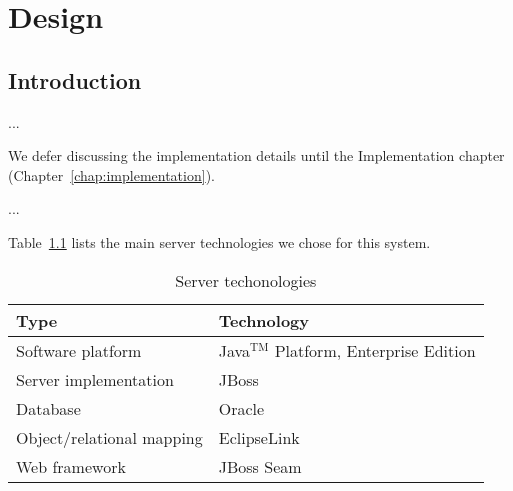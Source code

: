 

\chapter{Design}
\label{chap:design}

\section{Introduction}
\label{sec:designintroduction}

...

We defer discussing the implementation details until the Implementation chapter
(Chapter~\ref{chap:implementation}).

...

Table~\ref{tab:techtools} lists the main server technologies we chose 
for this system.

\begin{table}[!htpb]
  \centering
  \begin{tabular}[center]{|ll|}
\hline
Type & Technology \\
\hline
Software platform & Java$^{\textrm{TM}}$ Platform, Enterprise Edition\\
Server implementation & JBoss\\
Database & Oracle\\
Object/relational mapping & EclipseLink\\
Web framework & JBoss Seam\\
\hline
  \end{tabular}
  \caption{Server techonologies}
  \label{tab:techtools}
\end{table}











